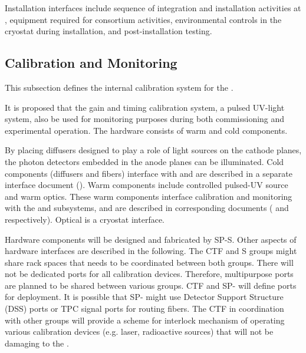 Installation interfaces include sequence of integration and installation activities at \surf, equipment required for  consortium activities, environmental controls in the cryostat during installation, and post-installation testing.


\subsection{Calibration and Monitoring}
\label{sec:fdsp-pd-intfc-calib}



This subsection defines the internal calibration system for the \single {}. 

It is proposed that the \single {} gain and timing calibration system, a pulsed UV-light system, also be used for  monitoring purposes during both commissioning and experimental operation. The hardware consists of warm and cold components.  


By placing diffusers designed to play a role of light sources on the cathode planes, the photon detectors embedded in the anode planes can be illuminated.
Cold components (diffusers and fibers) interface with  and are described in a separate interface document (). 
Warm components include controlled pulsed-UV source and warm optics. These warm components interface calibration and monitoring  with the  and  subsystems, and are described in corresponding documents ( and  respectively).
Optical \fdth is a cryostat interface. 

Hardware components will be designed and fabricated by SP-S. Other aspects of hardware interfaces are described in the following. The CTF and S groups might share rack spaces that needs to be coordinated between both groups. There will not be dedicated ports for all calibration devices. Therefore, multipurpose ports are planned to be shared between various groups. CTF and SP- will define ports for deployment. It is possible that SP- might use Detector Support Structure (DSS) ports or TPC signal ports for routing fibers. The CTF in coordination with other groups will provide a scheme for interlock mechanism of operating various calibration devices (e.g. laser, radioactive sources) that will not be damaging to the . 



